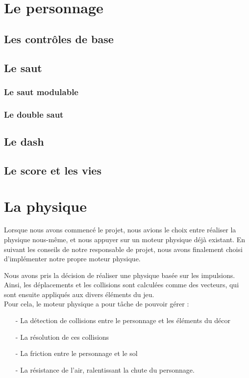 \documentclass[10pt]{report}
\begin{document}
\section{Le personnage}
\subsection{Les contrôles de base}
\subsection{Le saut}
\subsubsection{Le saut modulable}
\subsubsection{Le double saut}
\subsection{Le dash}
\subsection{Le score et les vies}

\section{La physique}
Lorsque nous avons commencé le projet, nous avions le choix entre réaliser la physique nous-même, et nous appuyer sur
un moteur physique déjà existant.
En suivant les conseils de notre responsable de projet, nous avons finalement choisi d'implémenter notre
propre moteur physique.

Nous avons pris la décision de réaliser une physique basée sur les impulsions.
Ainsi, les déplacements et les collisions sont calculées comme des vecteurs, qui sont ensuite appliqués aux
divers éléments du jeu.\\
Pour cela, le moteur physique a pour tâche de pouvoir gérer :
\begin{itemize}
  \item[-] La détection de collisions entre le personnage et les éléments du décor
  \item[-] La résolution de ces collisions
  \item[-] La friction entre le personnage et le sol
  \item[-] La résistance de l'air, ralentissant la chute du personnage.
\end{itemize}
\end{document}
